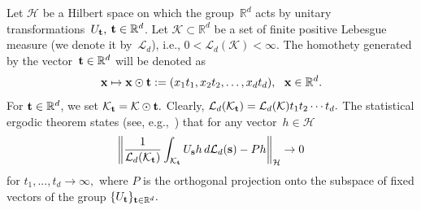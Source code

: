 \documentclass[12pt]{article}
\begin{document}
Let $\mathcal{H}$ be a Hilbert space on which the group~${\mathbb{R}^d}$ acts by unitary transformations~${U_{\bf t}},$ ${{\bf t}\in\mathbb{R}^d}$. Let ${\mathcal{K}\subset\mathbb{R}^d}$ be a set of finite positive Lebesgue measure (we denote it by~${\mathcal{L}_d}$), i.e., ${0<\mathcal{L}_d(\mathcal{K})<\infty}.$ The homothety generated by the vector~${{\bf t}\in\mathbb{R}^d}$ will be denoted as
$$
{\bf x}\mapsto {\bf x}\odot{\bf t}:=(x_1t_1,x_2t_2,\dots,x_dt_d),\ \ {\bf x}\in\mathbb{R}^d.
$$
For ${{\bf t}\in\mathbb{R}^d}$, we set $\mathcal{K}_{\bf t}=\mathcal{K}\odot {\bf t}.$ Clearly, ${\mathcal{L}_d(\mathcal{K}_{\bf t})=\mathcal{L}_d(\mathcal{K})t_1t_2\cdots t_d}.$ The statistical ergodic theorem states (see, e.g.,~\cite{Tem92}) that for any vector~${h\in\mathcal{H}}$
$$
\left\|\frac{1}{\mathcal{L}_d(\mathcal{K}_{\bf t})}\int_{\mathcal{K}_{\bf t}}U_{\bf s}h\,d\mathcal{L}_d({\bf s})-Ph\right\|_{\mathcal{H}}\to0
$$
for ${t_1,...,t_d\to\infty},$ where $P$ is the orthogonal projection onto the subspace of fixed vectors of the group $\{U_{\bf t}\}_{{\bf t}\in\mathbb{R}^d}.$
\end{document}
